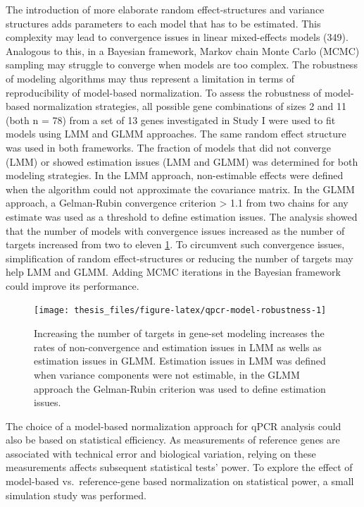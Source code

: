 \documentclass[twoside,10pt]{gihclass} %
\begin{document}
The introduction of more elaborate random effect-structures and variance structures adds parameters to each model that has to be estimated. This complexity may lead to convergence issues in linear mixed-effects models
(349).
Analogous to this, in a Bayesian framework, Markov chain Monte Carlo (MCMC) sampling may struggle to converge when models are too complex.
The robustness of modeling algorithms may thus represent a limitation in terms of reproducibility of model-based normalization.
To assess the robustness of model-based normalization strategies, all possible gene combinations of sizes 2 and 11 (both n = 78) from a set of 13 genes investigated in Study I were used to fit models using LMM and GLMM approaches.
The same random effect structure was used in both frameworks.
The fraction of models that did not converge (LMM) or showed estimation issues (LMM and GLMM) was determined for both modeling strategies. In the LMM approach, non-estimable effects were defined when the algorithm could not approximate the covariance matrix. In the GLMM approach, a Gelman-Rubin convergence criterion \textgreater{} 1.1 from two chains for any estimate was used as a threshold to define estimation issues.
The analysis showed that the number of models with convergence issues increased as the number of targets increased from two to eleven \ref{fig:qpcr-model-robustness}. To circumvent such convergence issues, simplification of random effect-structures or reducing the number of targets may help LMM and GLMM. Adding MCMC iterations in the Bayesian framework could improve its performance.
\begin{figure}

{\centering \texttt{[image: thesis\_files/figure-latex/qpcr-model-robustness-1]} 

}

\caption[Robustness of model-based qPCR normalization]{Increasing the number of targets in gene-set modeling increases the rates of non-convergence and estimation issues in LMM as wells as estimation issues in GLMM. Estimation issues in LMM was defined when variance components were not estimable, in the GLMM approach the Gelman-Rubin criterion was used to define estimation issues.}\label{fig:qpcr-model-robustness}
\end{figure}
The choice of a model-based normalization approach for qPCR analysis could also be based on statistical efficiency. As measurements of reference genes are associated with technical error and biological variation, relying on these measurements affects subsequent statistical tests' power. To explore the effect of model-based vs.~reference-gene based normalization on statistical power, a small simulation study was performed.
\end{document}
